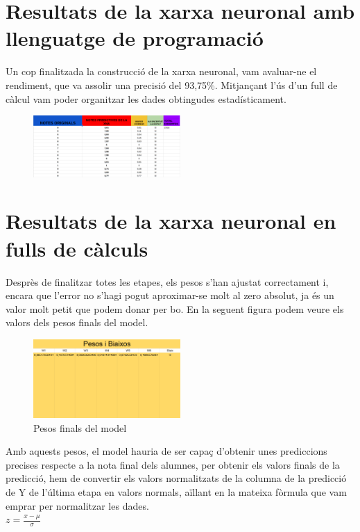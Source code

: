 
\section{Resultats de la xarxa neuronal amb llenguatge de programació}
Un cop finalitzada la construcció de la xarxa neuronal, vam avaluar-ne el rendiment, que va assolir una precisió del 93,75\%. Mitjançant l’ús d’un full de càlcul vam poder organitzar les dades obtingudes estadísticament.

\begin{figure}
 \centering
 \includegraphics[width=0.5\textwidth]{./figures/Resultats.png}
\end{figure}


\section{Resultats de la xarxa neuronal en fulls de càlculs}\label{sec: full de càlcul}
Desprès de finalitzar totes les etapes, els pesos s'han ajustat correctament i, encara que l'error no s'hagi pogut aproximar-se molt al zero absolut, ja és un valor molt petit que podem donar per bo. En la seguent figura podem veure els valors dels pesos finals del model.\\

\begin{figure}[H]
    \centering
    \includegraphics[width=0.5\textwidth]{./figures/Pesos_finals.png}
    \caption{Pesos finals del model}
\end{figure}

Amb aquests pesos, el model hauria de ser capaç d'obtenir unes prediccions precises respecte a la nota final dels alumnes, per obtenir els valors finals de la predicció, hem de convertir els valors normalitzats de la columna de la predicció de Y de l'última etapa en valors normals, aïllant en la mateixa fòrmula que vam emprar per normalitzar les dades.\\
$z = \frac{x - \mu}{\sigma}$\\

